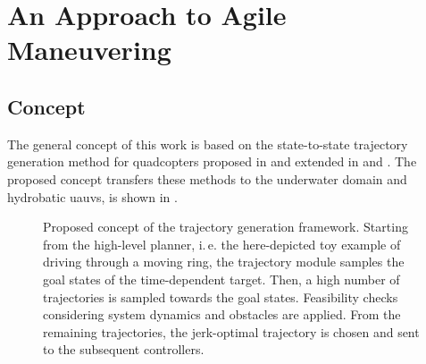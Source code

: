 
\chapter{An Approach to Agile Maneuvering}
\label{chap:approach-to-agile-maneuvering}

\section{Concept}\label{sec:concept}
The general concept of this work is based on the state-to-state trajectory generation method for quadcopters proposed in \cite{Mueller13} and extended in \cite{MuellerHehn15} and \cite{Bucki19}. The proposed concept transfers these methods to the underwater domain and hydrobatic \acp{uauv}, is shown in . 
\begin{figure}
    \centering
    
	\caption{Proposed concept of the trajectory generation framework. Starting from the high-level planner, i.\,e. the here-depicted toy example of driving through a moving ring, the trajectory module samples the goal states of the time-dependent target. Then, a high number of trajectories is sampled towards the goal states. Feasibility checks considering system dynamics and obstacles are applied. From the remaining trajectories, the jerk-optimal trajectory is chosen and sent to the subsequent controllers.}
	\label{fig:overview}
\end{figure}
